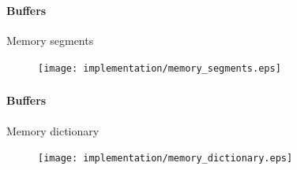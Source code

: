 \begin{frame}[fragile]
    \frametitle{\ImplementationTitle}
    \framesubtitle{Buffers}
    Memory segments\\
    \begin{minipage}[t]{1\textwidth}
        \begin{figure}
                \centering
                \texttt{[image: implementation/memory\_segments.eps]}
        \end{figure}
    \end{minipage}
\end{frame}

\begin{frame}[fragile]
    \frametitle{\ImplementationTitle}
    \framesubtitle{Buffers}
    Memory dictionary\\
    \begin{minipage}[t]{1\textwidth}
        \begin{figure}
                \centering
                \texttt{[image: implementation/memory\_dictionary.eps]}
        \end{figure}
    \end{minipage}
\end{frame}

